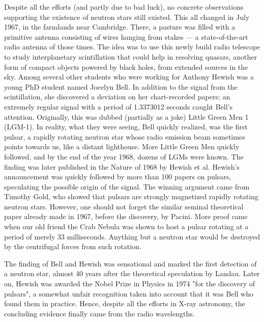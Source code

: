 Despite all the efforts (and partly due to bad luck), no concrete observations supporting the existence of neutron stars still existed.
This all changed in July 1967, in the farmlands near Cambridge.
There, a pasture was filled with a primitive antenna consisting of wires hanging from stakes --- a state-of-the-art radio antenna of those times.
The idea was to use this newly build radio telescope to study interplanetary scintillation that could help in resolving quasars, another form of compact objects powered by black holes, from extended sources in the sky.
Among several other students who were working for Anthony Hewish was a young PhD student named Jocelyn Bell.
In addition to the signal from the scintillation, she discovered a deviation on her chart-recorded papers; 
an extremely regular signal with a period of 1.3373012 seconds caught Bell's attention.
Originally, this was dubbed (partially as a joke) Little Green Men 1 (LGM-1).
In reality, what they were seeing, Bell quickly realized, was the first pulsar, a rapidly rotating neutron star whose radio emission beam sometimes points towards us, like a distant lighthouse.
More Little Green Men quickly followed, and by the end of the year 1968, dozens of LGMs were known.
The finding was later published in the Nature of 1968 by Hewish et al.\cite{Hewish68}
Hewish's announcement was quickly followed by more than 100 papers on pulsars, speculating the possible origin of the signal.
The winning argument came from Timothy Gold, who showed that pulsars are strongly magnetized rapidly rotating neutron stars.\cite{Gold68}
However, one should not forget the similar seminal theoretical paper already made in 1967, before the discovery, by Pacini.\cite{Pacini67}
More proof came when our old friend the Crab Nebula was shown to host a pulsar rotating at a period of merely $33$ milliseconds.\cite{CCL69}
Anything but a neutron star would be destroyed by the centrifugal forces from such rotation.

The finding of Bell and Hewish was sensational and marked the first detection of a neutron star, almost 40 years after the theoretical speculation by Landau.
Later on, Hewish was awarded the Nobel Prize in Physics in 1974 "for the discovery of pulsars", a somewhat unfair recognition taken into account that it was Bell who found them in practice.
Hence, despite all the efforts in X-ray astronomy, the concluding evidence finally came from the radio wavelengths.


